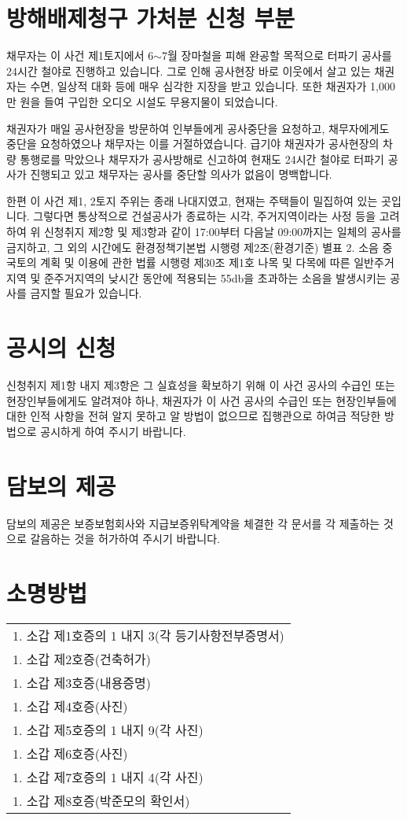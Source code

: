 \documentclass[12pt]{oblivoir}
\def\mysection#1{\hfil #1 \hfil} %
\begin{document}
\section{방해배제청구 가처분 신청 부분}
채무자는 이 사건 제1토지에서 6$\sim$7월 장마철을 피해 완공할 목적으로 터파기 공사를 24시간 철야로 진행하고 있습니다. 그로 인해 공사현장 바로 이웃에서 살고 있는 채권자는 수면, 일상적 대화 등에 매우 심각한 지장을 받고 있습니다. 또한 채권자가 1,000만 원을 들여 구입한 오디오 시설도 무용지물이 되었습니다.\par
채권자가 매일 공사현장을 방문하여 인부들에게 공사중단을 요청하고, 채무자에게도 중단을 요청하였으나 채무자는 이를 거절하였습니다. 급기야 채권자가 공사현장의 차량 통행로를 막았으나 채무자가 공사방해로 신고하여 현재도 24시간 철야로 터파기 공사가 진행되고 있고 채무자는 공사를 중단할 의사가 없음이 명백합니다.\par
한편 이 사건 제1, 2토지 주위는 종래 나대지였고, 현재는 주택들이 밀집하여 있는 곳입니다. 그렇다면 통상적으로 건설공사가 종료하는 시각, 주거지역이라는 사정 등을 고려하여 위 신청취지 제2항 및 제3항과 같이 17:00부터 다음날 09:00까지는 일체의 공사를 금지하고, 그 외의 시간에도 환경정책기본법 시행령 제2조(환경기준) 별표 2. 소음 중 국토의 계획 및 이용에 관한 법률 시행령 제30조 제1호 나목 및 다목에 따른 일반주거지역 및 준주거지역의 낮시간 동안에 적용되는 55\si{\decibel}을 초과하는 소음을 발생시키는 공사를 금지할 필요가 있습니다.
\section{공시의 신청}
신청취지 제1항 내지 제3항은 그 실효성을 확보하기 위해 이 사건 공사의 수급인 또는 현장인부들에게도 알려져야 하나, 채권자가 이 사건 공사의 수급인 또는 현장인부들에 대한 인적 사항을 전혀 알지 못하고 알 방법이 없으므로 집행관으로 하여금 적당한 방법으로 공시하게 하여 주시기 바랍니다.
\section{담보의 제공}
담보의 제공은 보증보험회사와 지급보증위탁계약을 체결한 각 문서를 각 제출하는 것으로 갈음하는 것을 허가하여 주시기 바랍니다.
\vspace{5em}
\section*{\mysection{소명방법}}
\vspace{2em}
\begin{tabu} to \linewidth{X}
    1. 소갑 제1호증의 1 내지 3(각 등기사항전부증명서)\\
    1. 소갑 제2호증(건축허가)\\
    1. 소갑 제3호증(내용증명)\\
    1. 소갑 제4호증(사진)\\
    1. 소갑 제5호증의 1 내지 9(각 사진)\\
    1. 소갑 제6호증(사진)\\
    1. 소갑 제7호증의 1 내지 4(각 사진)\\
    1. 소갑 제8호증(박준모의 확인서)
  \end{tabu}
\bigskip
\end{document}
